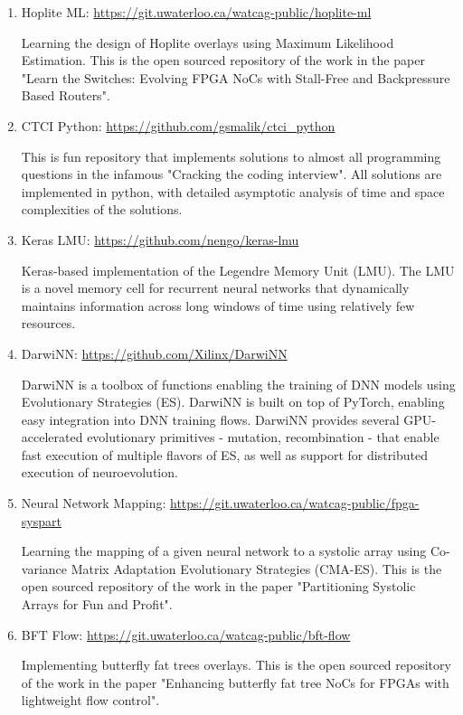 \begin{enumerate}
    \item Hoplite ML: \href{https://git.uwaterloo.ca/watcag-public/hoplite-ml}{https://git.uwaterloo.ca/watcag-public/hoplite-ml}
    
    Learning the design of Hoplite overlays using Maximum Likelihood Estimation. This is the open sourced repository of the work in the paper "Learn the Switches: Evolving FPGA NoCs with Stall-Free and Backpressure Based Routers".
    
    \item CTCI Python: \href{https://github.com/gsmalik/ctci_python}{https://github.com/gsmalik/ctci\_python}
    
    This is fun repository that implements solutions to almost all programming questions in the infamous "Cracking the coding interview". All solutions are implemented in python, with detailed asymptotic analysis of time and space complexities of the solutions.
    
    \item Keras LMU: \href{https://github.com/nengo/keras-lmu}{https://github.com/nengo/keras-lmu}
    
    Keras-based implementation of the Legendre Memory Unit (LMU). The LMU is a novel memory cell for recurrent neural networks that dynamically maintains information across long windows of time using relatively few resources.
    
    \item DarwiNN: \href{https://github.com/Xilinx/DarwiNN}{https://github.com/Xilinx/DarwiNN}
    
    DarwiNN is a toolbox of functions enabling the training of DNN models using Evolutionary Strategies (ES). DarwiNN is built on top of PyTorch, enabling easy integration into DNN training flows. DarwiNN provides several GPU-accelerated evolutionary primitives - mutation, recombination - that enable fast execution of multiple flavors of ES, as well as support for distributed execution of neuroevolution.
    
    \item Neural Network Mapping: \href{https://git.uwaterloo.ca/watcag-public/fpga-syspart}{https://git.uwaterloo.ca/watcag-public/fpga-syspart}
    
    Learning the mapping of a given neural network to a systolic array using Co-variance Matrix Adaptation Evolutionary Strategies (CMA-ES). This is the open sourced repository of the work in the paper "Partitioning Systolic Arrays for Fun and Profit".
    
    \item BFT Flow: \href{https://git.uwaterloo.ca/watcag-public/bft-flow}{https://git.uwaterloo.ca/watcag-public/bft-flow}
    
    Implementing butterfly fat trees overlays. This is the open sourced repository of the work in the paper "Enhancing butterfly fat tree NoCs for FPGAs with lightweight flow control".
\end{enumerate}

